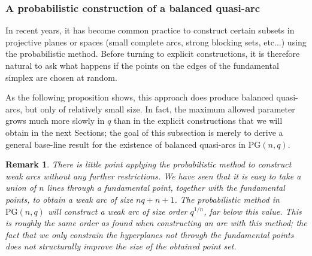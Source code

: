 \documentclass{article}
\newtheorem{remark}{Remark}
\newcommand{\PG}{\mathrm{PG}}
\begin{document}
\subsubsection{A probabilistic construction of a balanced quasi-arc}

In recent years, it has become common practice to construct certain subsets in projective planes or spaces (small complete arcs, strong blocking sets, etc...) using the probabilistic method. 
Before turning to explicit constructions, it is therefore natural to ask what happens if the points on the edges of the fundamental simplex are chosen at random. 

As the following proposition shows, this approach does produce balanced quasi-arcs, but only of relatively small size. In fact, the maximum allowed parameter grows much more slowly in $q$ than in the explicit constructions that we will obtain in the next Sections; the goal of this subsection is merely to derive a general base-line result for the existence of balanced quasi-arcs in $\PG(n,q)$.

\begin{remark}
There is little point applying the probabilistic method to construct weak arcs without any further restrictions. We have seen that it is easy to take a union of $n$ lines through a fundamental point, together with the fundamental points, to obtain a weak arc of size $nq+n+1$. The probabilistic method in $\PG(n,q)$ will construct a weak arc of size order $q^{1/n}$, far below this value. This is roughly the same order as found when constructing an arc with this method; the fact that we only constrain the hyperplanes not through the fundamental points does not structurally improve the size of the obtained point set. 
\end{remark}



\end{document}
